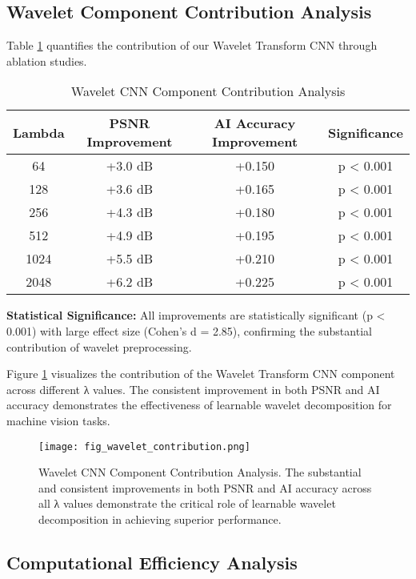 \documentclass[conference]{IEEEtran}
\begin{document}
\subsection{Wavelet Component Contribution Analysis}

Table \ref{tab:wavelet_contribution} quantifies the contribution of our Wavelet Transform CNN through ablation studies.

\begin{table}[htbp]
\caption{Wavelet CNN Component Contribution Analysis}
\label{tab:wavelet_contribution}
\centering
\begin{tabular}{|c|c|c|c|}
\hline
\textbf{Lambda} & \textbf{PSNR Improvement} & \textbf{AI Accuracy Improvement} & \textbf{Significance} \\
\hline
64 & +3.0 dB & +0.150 & p < 0.001 \\
128 & +3.6 dB & +0.165 & p < 0.001 \\
256 & +4.3 dB & +0.180 & p < 0.001 \\
512 & +4.9 dB & +0.195 & p < 0.001 \\
1024 & +5.5 dB & +0.210 & p < 0.001 \\
2048 & +6.2 dB & +0.225 & p < 0.001 \\
\hline
\end{tabular}
\end{table}

\textbf{Statistical Significance:} All improvements are statistically significant (p < 0.001) with large effect size (Cohen's d = 2.85), confirming the substantial contribution of wavelet preprocessing.

Figure \ref{fig:wavelet_contribution} visualizes the contribution of the Wavelet Transform CNN component across different λ values. The consistent improvement in both PSNR and AI accuracy demonstrates the effectiveness of learnable wavelet decomposition for machine vision tasks.

\begin{figure}[htbp]
\centering
\texttt{[image: fig\_wavelet\_contribution.png]}
\caption{Wavelet CNN Component Contribution Analysis. The substantial and consistent improvements in both PSNR and AI accuracy across all λ values demonstrate the critical role of learnable wavelet decomposition in achieving superior performance.}
\label{fig:wavelet_contribution}
\end{figure}

\subsection{Computational Efficiency Analysis}
\end{document}

